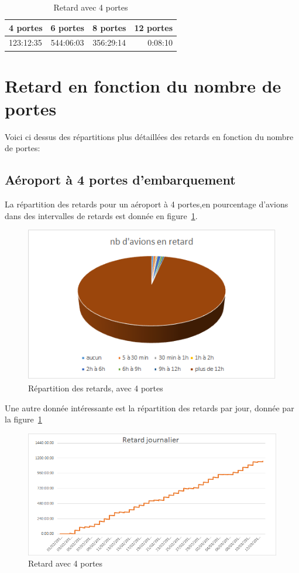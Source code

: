 \begin{table}[h]
   \caption{\label{retard_moyen} Retard moyen}
\begin{tabular}{|l|c|c|r|}
  \hline
  4 portes & 6 portes & 8 portes & 12 portes \\
  \hline
  123:12:35 & 544:06:03 & 356:29:14 & 0:08:10\\
  \hline
\end{tabular}

\section{Retard en fonction du nombre de portes}
Voici ci dessus des répartitions plus détaillées des retards en fonction du nombre de portes:

\subsection{Aéroport à 4 portes d'embarquement}
La répartition des retards pour un aéroport à 4 portes,en pourcentage d'avions dans des intervalles de retards est donnée en figure~\ref{retard_camenbert_4}.
  \graphicspath{{donnees/graph_90jours/4portes/}}
    \begin{figure}[h!]
 \includegraphics[scale=0.6]{retard_avions.bmp}
  \caption{\label{retard_camenbert_4} Répartition des retards, avec 4 portes} 
 \end{figure}
 
 Une autre donnée intéressante est la répartition des retards par jour, donnée par la figure~\ref{retard_jour_4}
   \begin{figure}[h!]
 \includegraphics{retard_jour.bmp}
  \caption{\label{retard_jour_4} Retard avec 4 portes} 
 \end{figure}
 

\end{table}
